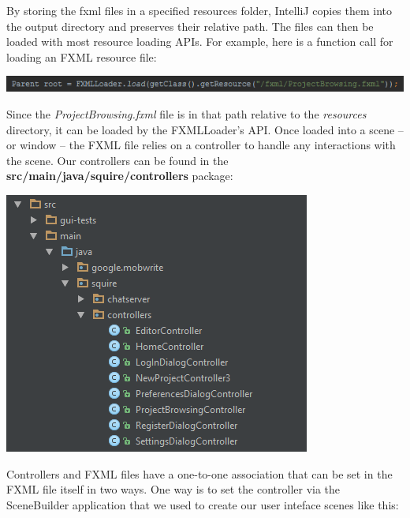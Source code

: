 \documentclass[twoside,letterpaper]{article}
\begin{document}
By storing the fxml files in a specified resources folder, IntelliJ copies them into the output directory and preserves their relative path. The files can then be loaded with most resource loading APIs. For example, here is a function call for loading an FXML resource file:

\begin{center}
\includegraphics[scale=1]{images/Implementation/Loader.png}
\end{center}

Since the \textit{ProjectBrowsing.fxml} file is in that path relative to the \textit{resources} directory, it can be loaded by the FXMLLoader's API. Once loaded into a scene -- or window -- the FXML file relies on a controller to handle any interactions with the scene. Our controllers can be found in the \textbf{src/main/java/squire/controllers} package:

\begin{center}
	\includegraphics[scale=1]{images/Implementation/Controllers.png}
\end{center}

\newpage
Controllers and FXML files have a one-to-one association that can be set in the FXML file itself in two ways. One way is to set the controller via the SceneBuilder application that we used to create our user inteface scenes like this:
\end{document}
